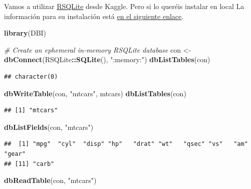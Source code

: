 \documentclass[]{book}
\newenvironment{Shaded}{\begin{snugshade}}{\end{snugshade}}
\newcommand{\KeywordTok}[1]{\textcolor[rgb]{0.13,0.29,0.53}{\textbf{#1}}}
\newcommand{\StringTok}[1]{\textcolor[rgb]{0.31,0.60,0.02}{#1}}
\newcommand{\CommentTok}[1]{\textcolor[rgb]{0.56,0.35,0.01}{\textit{#1}}}
\newcommand{\OperatorTok}[1]{\textcolor[rgb]{0.81,0.36,0.00}{\textbf{#1}}}
\newcommand{\NormalTok}[1]{#1}
\begin{document}
Vamos a utilizar
\href{https://cran.r-project.org/web/packages/RSQLite/index.html}{RSQLite}
desde Kaggle. Pero si lo queréis instalar en local La información para
su instalación está \href{https://db.rstudio.com/databases/sqlite/}{en
el siguiente enlace}.

\begin{Shaded}
\begin{Highlighting}[]
\KeywordTok{library}\NormalTok{(DBI)}

\CommentTok{# Create an ephemeral in-memory RSQLite database}
\NormalTok{con <-}\StringTok{ }\KeywordTok{dbConnect}\NormalTok{(RSQLite}\OperatorTok{::}\KeywordTok{SQLite}\NormalTok{(), }\StringTok{":memory:"}\NormalTok{)}
\KeywordTok{dbListTables}\NormalTok{(con)}
\end{Highlighting}
\end{Shaded}

\begin{verbatim}
## character(0)
\end{verbatim}

\begin{Shaded}
\begin{Highlighting}[]
\KeywordTok{dbWriteTable}\NormalTok{(con, }\StringTok{"mtcars"}\NormalTok{, mtcars)}
\KeywordTok{dbListTables}\NormalTok{(con)}
\end{Highlighting}
\end{Shaded}

\begin{verbatim}
## [1] "mtcars"
\end{verbatim}

\begin{Shaded}
\begin{Highlighting}[]
\KeywordTok{dbListFields}\NormalTok{(con, }\StringTok{"mtcars"}\NormalTok{)}
\end{Highlighting}
\end{Shaded}

\begin{verbatim}
##  [1] "mpg"  "cyl"  "disp" "hp"   "drat" "wt"   "qsec" "vs"   "am"   "gear"
## [11] "carb"
\end{verbatim}

\begin{Shaded}
\begin{Highlighting}[]
\KeywordTok{dbReadTable}\NormalTok{(con, }\StringTok{"mtcars"}\NormalTok{)}
\end{Highlighting}
\end{Shaded}
\end{document}

